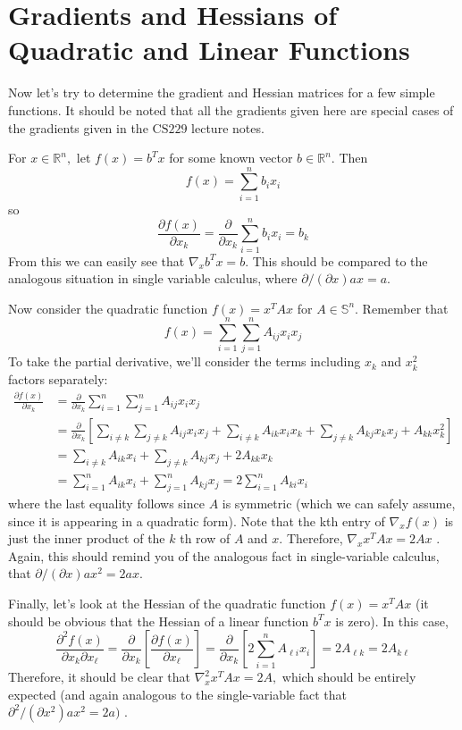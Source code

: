 \documentclass[10pt,a4paper,oneside]{article}
\begin{document}
\section{Gradients and Hessians of Quadratic and Linear Functions}
Now let's try to determine the gradient and Hessian matrices for a few simple functions. It
should be noted that all the gradients given here are special cases of the gradients given in
the \(\mathrm{CS} 229\) lecture notes.

For \(x \in \mathbb{R}^{n},\) let \(f(x)=b^{T} x\) for some known vector \(b \in \mathbb{R}^{n}\). Then
\[
f(x)=\sum_{i=1}^{n} b_{i} x_{i}
\]
so
\[
\frac{\partial f(x)}{\partial x_{k}}=\frac{\partial}{\partial x_{k}} \sum_{i=1}^{n} b_{i} x_{i}=b_{k}
\]
From this we can easily see that \(\nabla_{x} b^{T} x=b .\) This should be compared to the analogous situation in single variable calculus, where \(\partial /(\partial x) a x=a\).

Now consider the quadratic function \(f(x)=x^{T} A x\) for \(A \in \mathbb{S}^{n}\). Remember that
\[
f(x)=\sum_{i=1}^{n} \sum_{j=1}^{n} A_{i j} x_{i} x_{j}
\]
To take the partial derivative, we'll consider the terms including \(x_{k}\) and \(x_{k}^{2}\) factors separately:
\[
\begin{aligned} \frac{\partial f(x)}{\partial x_{k}} &=\frac{\partial}{\partial x_{k}} \sum_{i=1}^{n} \sum_{j=1}^{n} A_{i j} x_{i} x_{j} \\ &=\frac{\partial}{\partial x_{k}}\left[\sum_{i \neq k} \sum_{j \neq k} A_{i j} x_{i} x_{j}+\sum_{i \neq k} A_{i k} x_{i} x_{k}+\sum_{j \neq k} A_{k j} x_{k} x_{j}+A_{k k} x_{k}^{2}\right] \\ &=\sum_{i \neq k} A_{i k} x_{i}+\sum_{j \neq k} A_{k j} x_{j}+2 A_{k k} x_{k} \\ &=\sum_{i=1}^{n} A_{i k} x_{i}+\sum_{j=1}^{n} A_{k j} x_{j}=2 \sum_{i=1}^{n} A_{k i} x_{i} \end{aligned}
\]
where the last equality follows since \(A\) is symmetric (which we can safely assume, since it is appearing in a quadratic form). Note that the kth entry of \(\nabla_{x} f(x)\) is just the inner product of the \(k\) th row of \(A\) and \(x .\) Therefore, \(\nabla_{x} x^{T} A x=2 A x\) . Again, this should remind you of the analogous fact in single-variable calculus, that \(\partial /(\partial x) a x^{2}=2 a x\).

Finally, let's look at the Hessian of the quadratic function \(f(x)=x^{T} A x\) (it should be obvious that the Hessian of a linear function \(b^{T} x\) is zero). In this case,
\[
\frac{\partial^{2} f(x)}{\partial x_{k} \partial x_{\ell}}=\frac{\partial}{\partial x_{k}}\left[\frac{\partial f(x)}{\partial x_{\ell}}\right]=\frac{\partial}{\partial x_{k}}\left[2 \sum_{i=1}^{n} A_{\ell i} x_{i}\right]=2 A_{\ell k}=2 A_{k \ell}
\]
Therefore, it should be clear that \(\nabla_{x}^{2} x^{T} A x=2 A,\) which should be entirely expected (and again analogous to the single-variable fact that \(\partial^{2} /\left(\partial x^{2}\right) a x^{2}=2 a )\) .
\end{document}
